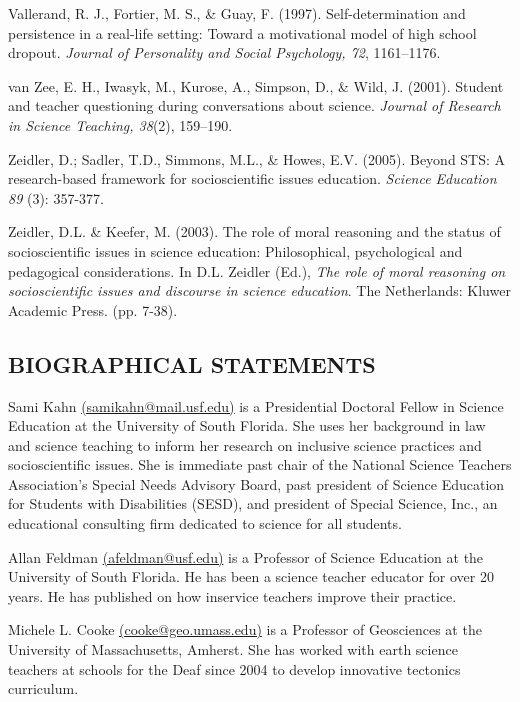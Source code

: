 \documentclass[11.5pt]{sig-alternate} %
\begin{document}
Vallerand, R. J., Fortier, M. S., \& Guay, F. (1997). Self-determination and persistence in a real-life setting: Toward a motivational model of high school dropout. \textit{Journal of Personality and Social Psychology, 72}, 1161–1176.

van Zee, E. H., Iwasyk, M., Kurose, A., Simpson, D., \& Wild, J. (2001). Student and teacher questioning during conversations about science. \textit{Journal of Research in Science Teaching, 38}(2), 159–190.

Zeidler, D.; Sadler, T.D., Simmons, M.L., \& Howes, E.V. (2005). Beyond STS: A research-based framework for socioscientific issues education. \textit{Science Education 89} (3): 357-377.

Zeidler, D.L. \& Keefer, M. (2003). The role of moral reasoning and the status of socioscientific issues in science education: Philosophical, psychological and pedagogical considerations. In D.L. Zeidler (Ed.), \textit{The role of moral reasoning on socioscientific issues and discourse in science education}. The Netherlands: Kluwer Academic Press. (pp. 7-38).
\newpage
\begin{large}

\leftskip 0in
\parindent 0in 
\section*{BIOGRAPHICAL STATEMENTS}
Sami Kahn \href{mailto:msamikahn@mail.usf.edu}{(samikahn@mail.usf.edu)} is a Presidential Doctoral Fellow in Science Education at the University of South Florida. She uses her background in law and science teaching to inform her research on inclusive science practices and socioscientific issues. She is immediate past chair of the National Science Teachers Association’s Special Needs Advisory Board, past president of Science Education for Students with Disabilities (SESD), and president of Special Science, Inc., an educational consulting firm dedicated to science for all students.  
   
Allan Feldman \href{mailto:afeldman@usf.edu}{(afeldman@usf.edu)} is a Professor of Science Education at the University of South Florida. He has been a science teacher educator for over 20 years. He has published on how inservice teachers improve their practice.  
  
Michele L. Cooke \href{mailto:cooke@geo.umass.edu}{(cooke@geo.umass.edu)} is a Professor of Geosciences at the University of Massachusetts, Amherst. She has worked with earth science teachers at schools for the Deaf since 2004 to develop innovative tectonics curriculum. 

\end{large}
\end{document}
